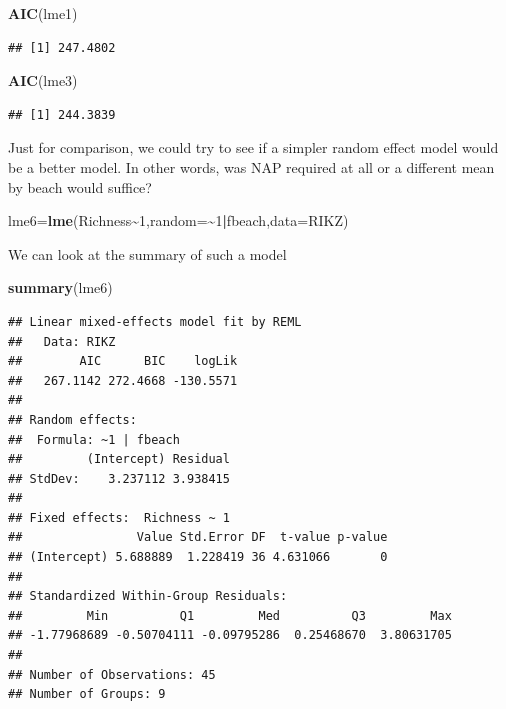 \documentclass[
]{book}
\newenvironment{Shaded}{\begin{snugshade}}{\end{snugshade}}
\newcommand{\AttributeTok}[1]{\textcolor[rgb]{0.13,0.29,0.53}{#1}}
\newcommand{\DecValTok}[1]{\textcolor[rgb]{0.00,0.00,0.81}{#1}}
\newcommand{\FunctionTok}[1]{\textcolor[rgb]{0.13,0.29,0.53}{\textbf{#1}}}
\newcommand{\NormalTok}[1]{#1}
\newcommand{\OtherTok}[1]{\textcolor[rgb]{0.56,0.35,0.01}{#1}}
\newcommand{\SpecialCharTok}[1]{\textcolor[rgb]{0.81,0.36,0.00}{\textbf{#1}}}
\begin{document}
\begin{Shaded}
\begin{Highlighting}[]
\FunctionTok{AIC}\NormalTok{(lme1)}
\end{Highlighting}
\end{Shaded}

\begin{verbatim}
## [1] 247.4802
\end{verbatim}

\begin{Shaded}
\begin{Highlighting}[]
\FunctionTok{AIC}\NormalTok{(lme3)}
\end{Highlighting}
\end{Shaded}

\begin{verbatim}
## [1] 244.3839
\end{verbatim}

Just for comparison, we could try to see if a simpler random effect model would be a better model. In other words, was NAP required at all or a different mean by beach would suffice?

\begin{Shaded}
\begin{Highlighting}[]
\NormalTok{lme6}\OtherTok{=}\FunctionTok{lme}\NormalTok{(Richness}\SpecialCharTok{\textasciitilde{}}\DecValTok{1}\NormalTok{,}\AttributeTok{random=}\SpecialCharTok{\textasciitilde{}}\DecValTok{1}\SpecialCharTok{|}\NormalTok{fbeach,}\AttributeTok{data=}\NormalTok{RIKZ)}
\end{Highlighting}
\end{Shaded}

We can look at the summary of such a model

\begin{Shaded}
\begin{Highlighting}[]
\FunctionTok{summary}\NormalTok{(lme6)}
\end{Highlighting}
\end{Shaded}

\begin{verbatim}
## Linear mixed-effects model fit by REML
##   Data: RIKZ 
##        AIC      BIC    logLik
##   267.1142 272.4668 -130.5571
## 
## Random effects:
##  Formula: ~1 | fbeach
##         (Intercept) Residual
## StdDev:    3.237112 3.938415
## 
## Fixed effects:  Richness ~ 1 
##                Value Std.Error DF  t-value p-value
## (Intercept) 5.688889  1.228419 36 4.631066       0
## 
## Standardized Within-Group Residuals:
##         Min          Q1         Med          Q3         Max 
## -1.77968689 -0.50704111 -0.09795286  0.25468670  3.80631705 
## 
## Number of Observations: 45
## Number of Groups: 9
\end{verbatim}
\end{document}
